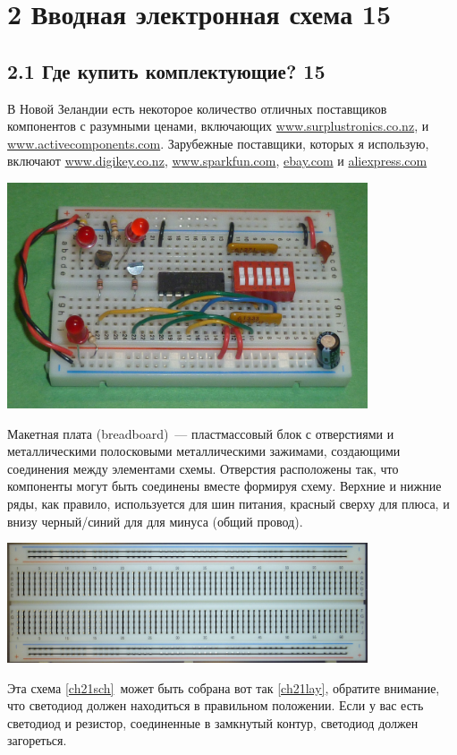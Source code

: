 
\chapter{2 Вводная электронная схема 15}

\section{2.1 Где купить комплектующие? 15}

В Новой Зеландии есть некоторое количество отличных поставщиков компонентов с
разумными ценами, включающих \url{www.surplustronics.co.nz}, и
\url{www.activecomponents.com}. Зарубежные поставщики, которых я использую,
включают \url{www.digikey.co.nz}, \url{www.sparkfun.com}, \url{ebay.com}
и \url{aliexpress.com}

\bigskip
\includegraphics[width=0.8\textwidth]{bcollis/breadboard2.jpg}

Макетная плата (breadboard)\ --- пластмассовый блок с отверстиями и
металлическими полосковыми металлическими зажимами, создающими соединения между
элементами схемы. Отверстия расположены так, что компоненты могут быть соединены
вместе формируя схему. Верхние и нижние ряды, как правило, используется для шин
питания, красный сверху для плюса, и внизу черный/синий для для минуса (общий
провод).

\includegraphics[width=0.8\textwidth]{bcollis/BreadboardConnections.jpg}

\bigskip

Эта схема \ref{ch21sch}\ может быть собрана вот так \ref{ch21lay}, обратите
внимание, что светодиод должен находиться в правильном положении. Если у вас
есть светодиод и резистор, соединенные в замкнутый контур, светодиод должен
загореться.

